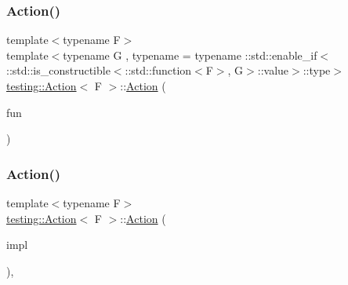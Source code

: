 \subsubsection{\texorpdfstring{Action()}{Action()}\hspace{0.1cm}{\footnotesize\ttfamily [2/12]}}
{\footnotesize\ttfamily template$<$typename F$>$ \\
template$<$typename G , typename  = typename \+::std\+::enable\+\_\+if$<$                \+::std\+::is\+\_\+constructible$<$\+::std\+::function$<$\+F$>$, G$>$\+::value$>$\+::type$>$ \\
\mbox{\hyperlink{classtesting_1_1_action}{testing\+::\+Action}}$<$ F $>$\+::\mbox{\hyperlink{classtesting_1_1_action}{Action}} (\begin{DoxyParamCaption}\item[{G \&\&}]{fun }\end{DoxyParamCaption})\hspace{0.3cm}{\ttfamily [inline]}}

\mbox{\label{classtesting_1_1_action_a5ce44c673e3f91378777b954d88917cd}} 
\subsubsection{\texorpdfstring{Action()}{Action()}\hspace{0.1cm}{\footnotesize\ttfamily [3/12]}}
{\footnotesize\ttfamily template$<$typename F$>$ \\
\mbox{\hyperlink{classtesting_1_1_action}{testing\+::\+Action}}$<$ F $>$\+::\mbox{\hyperlink{classtesting_1_1_action}{Action}} (\begin{DoxyParamCaption}\item[{\mbox{\hyperlink{classtesting_1_1_action_interface}{Action\+Interface}}$<$ F $>$ $\ast$}]{impl }\end{DoxyParamCaption})\hspace{0.3cm}{\ttfamily [inline]}, {\ttfamily [explicit]}}

\mbox{\label{classtesting_1_1_action_a806bacddaa1f1daf61f89674564bdf0f}} 

